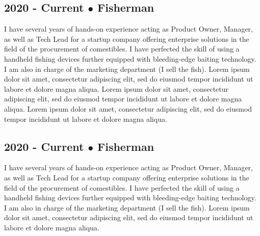 \subsection{2020 - Current $\bullet$ Fisherman}
I have several years of hands-on experience acting as Product Owner, Manager, as well as Tech Lead for a startup company offering enterprise solutions in the field of the procurement of comestibles. I have perfected the skill of using a handheld fishing devices further equipped with bleeding-edge baiting technology.
I am also in charge of the marketing department (I sell the fish).
Lorem ipsum dolor sit amet, consectetur adipiscing elit, sed do eiusmod tempor incididunt ut labore et dolore magna aliqua. 
Lorem ipsum dolor sit amet, consectetur adipiscing elit, sed do eiusmod tempor incididunt ut labore et dolore magna aliqua. 
Lorem ipsum dolor sit amet, consectetur adipiscing elit, sed do eiusmod tempor incididunt ut labore et dolore magna aliqua. 
\subsection{2020 - Current $\bullet$ Fisherman}
I have several years of hands-on experience acting as Product Owner, Manager, as well as Tech Lead for a startup company offering enterprise solutions in the field of the procurement of comestibles. I have perfected the skill of using a handheld fishing devices further equipped with bleeding-edge baiting technology.
I am also in charge of the marketing department (I sell the fish).
Lorem ipsum dolor sit amet, consectetur adipiscing elit, sed do eiusmod tempor incididunt ut labore et dolore magna aliqua. 
